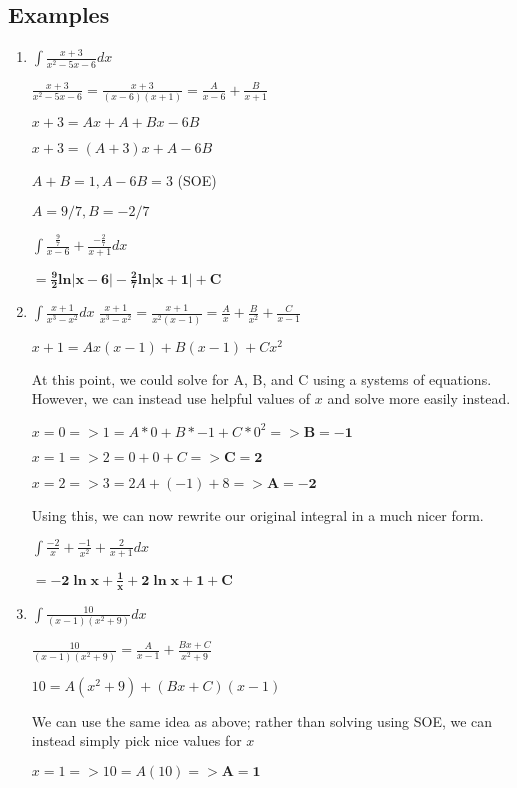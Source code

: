 \documentclass{article}
\begin{document}
\subsection{Examples}
\begin{enumerate}
    \item $\int \frac{x+3}{x^2-5x-6} dx$
    
    $\frac{x+3}{x^2-5x-6} = \frac{x+3}{(x-6)(x+1)} = \frac{A}{x-6} + \frac{B}{x+1}$
    
    $x+3 = Ax+A+Bx-6B$
    
    $x+3 = (A+3)x + A-6B$
    
    $A+B = 1, A-6B = 3$ (SOE)
    
    $A = 9/7, B = -2/7$
    
    $\int \frac{\frac{9}{7}}{x-6}+\frac{-\frac{2}{7}}{x+1}dx$
    
    $= \mathbf{\frac{9}{2} ln |x-6|-\frac{2}{7} ln |x+1| + C}$
    
    \item $\int \frac{x+1}{x^3-x^2}dx$
    $\frac{x+1}{x^3-x^2} = \frac{x+1}{x^2(x-1)} = \frac{A}{x} + \frac{B}{x^2} + \frac{C}{x-1}$
    
    $x+1 = Ax(x-1)+B(x-1)+Cx^2$
    
    At this point, we could solve for A, B, and C using a systems of equations. However, we can instead use helpful values of $x$ and solve more easily instead. 

    $x=0 => 1 = A*0 + B*-1 +C*0^2 => \mathbf{B = -1}$
    
    $x=1 => 2 = 0 + 0 + C => \mathbf{C = 2}$
    
    $x=2 => 3 = 2A + (-1) + 8 => \mathbf{A = -2}$

    Using this, we can now rewrite our original integral in a much nicer form.
    
    $\int \frac{-2}{x} + \frac{-1}{x^2} + \frac{2}{x+1} dx$
    
    $= \mathbf{-2\ln{x} + \frac{1}{x} + 2\ln{x+1} + C}$
    
    \item $\int \frac{10}{(x-1)(x^2+9)}dx$
    
    $\frac{10}{(x-1)(x^2+9)} = \frac{A}{x-1} + \frac{Bx+C}{x^2+9}$
    
    $10 = A(x^2+9) + (Bx+C)(x-1)$
    
    We can use the same idea as above; rather than solving using SOE, we can instead simply pick nice values for $x$
    
    $x=1 => 10 = A(10) => \mathbf{A=1}$
    

\end{enumerate}
\end{document}
